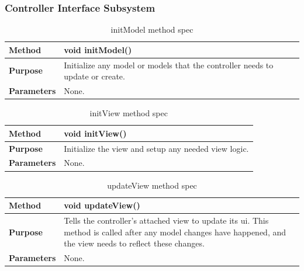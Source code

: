 \documentclass[12pt]{article}
\begin{document}
\subsubsection{Controller Interface Subsystem}

\begin{table}[H]
  \caption{initModel method spec}
  \begin{center}
    \begin{tabular}{|l|p{10cm}|}
      \hline
      \bf Method & void initModel()\\
		\hline
      \bf Purpose & Initialize any model or models that the controller needs to update or create.\\
		\hline
      \bf Parameters & None.\\
		\hline
    \end{tabular}
  \end{center}
\end{table}

\begin{table}[H]
  \caption{initView method spec}
  \begin{center}
    \begin{tabular}{|l|p{10cm}|}
      \hline
      \bf Method & void initView()\\
		\hline
      \bf Purpose &  Initialize the view and setup any needed view logic.\\
		\hline
      \bf Parameters & None.\\
		\hline
    \end{tabular}
  \end{center}
\end{table}

\begin{table}[H]
  \caption{updateView method spec}
  \begin{center}
    \begin{tabular}{|l|p{10cm}|}
      \hline
      \bf Method & void updateView()\\
		\hline
      \bf Purpose & Tells the controller's attached view to update its ui. This method is called after any model changes have happened, and the view needs to reflect these changes.\\
		\hline
      \bf Parameters & None.\\
		\hline
    \end{tabular}
  \end{center}
\end{table}
\end{document}
